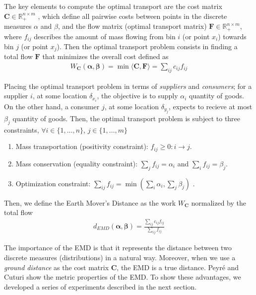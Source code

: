 The key elements to compute the optimal transport are the cost matrix $\mathbf{C} \in \mathbb{R}^{n\times m}_+$ , which define all pairwise costs between points in the discrete measures $\alpha$ and $\beta$, and the flow matrix (optimal transport matrix) $\mathbf{F} \in \mathbb{R}^{n\times m}_+$, where $f_{ij}$ describes the amount of mass flowing from bin $i$ (or point $x_i$) towards bin $j$ (or point $x_j$). Then the optimal transport problem consists in finding a total flow $\mathbf{F}$ that minimizes the overall cost defined as
\begin{eqnarray}
W_{\mathbf{C}}(\boldsymbol{\alpha}, \boldsymbol{\beta}) = \min \langle\mathbf{C},\mathbf{F}\rangle = \sum\nolimits_{ij} c_{ij}f_{ij}
\label{eq:optimal_work}
\end{eqnarray}

Placing the optimal transport problem in terms of \textit{suppliers} and \textit{consumers}; for a supplier $i$, at some location $\delta_{x_i}$, the objective is to supply $\alpha_i$ quantity of goods. On the other hand, a consumer $j$, at some location $\delta_{y_j}$, expects to recieve at most $\beta_j$ quantity of goods. Then, the optimal transport problem is subject to three constraints, $\forall i \in\{1, \ldots, n\}$, $j \in\{1, \ldots, m\}$

\begin{enumerate}%
 \item Mass transportation (positivity constraint): $f_{ij} \geq 0 : i\rightarrow j$.
 \item Mass conservation (equality constraint):  $\sum_{j}f_{ij}=\alpha_i$ and $\sum_{i}f_{ij}= \beta_j$.
 \item Optimization constraint: $\sum_{ij}f_{ij} = \min \left( \sum_{i}\alpha_i, \sum_{j}\beta_j \right)$ .
\end{enumerate}  

Then, we define the Earth Mover's Distance as the work $W_{\mathbf{C}}$ normalized by the total flow
\begin{eqnarray}
d_{EMD}(\boldsymbol{\alpha}, \boldsymbol{\beta}) = \frac{\sum_{ij}c_{ij}f_{ij}}{\sum_{ij}f_{ij}}
\label{eq:emd}
\end{eqnarray}

The importance of the EMD is that it represents the distance between two discrete measures (distributions) in a natural way. Moreover, when we use a \textit{ground distance} as the cost matrix $\mathbf{C}$, the EMD is a true distance. Peyré and Cuturi \citep{Peyre.Cuturi:arXiv:2018} show the metric properties of the EMD. To show these advantages, we developed a series of experiments described in the next section.


